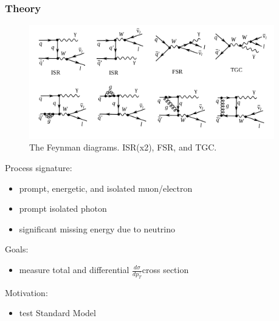 \begin{frame}\frametitle{Theory}
\scriptsize
\begin{figure}[htb]
\begin{center}
\scriptsize
\includegraphics[width=0.95\textwidth]{../figs/WgAbout/feynmWg_LO_NLO.png}
\caption{\scriptsize{The Feynman diagrams. ISR(x2), FSR, and TGC.}}
\end{center}
\end{figure}
\scriptsize
Process signature:\\
\begin{itemize}
\item prompt, energetic, and isolated muon/electron
\item prompt isolated photon
\item significant missing energy due to neutrino 
\end{itemize}
Goals:\\
\begin{itemize}
\item measure total and differential $\frac{d\sigma}{dp_{T}^{\gamma}}$cross section
\end{itemize}
Motivation:\\
\begin{itemize}
\item test Standard Model
\end{itemize}
\end{frame}%
